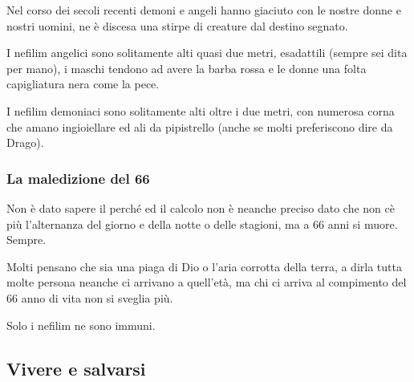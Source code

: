 \documentclass[12pt,a4paper,twoside,openany]{book}
\begin{document}
Nel corso dei secoli recenti demoni e angeli hanno giaciuto con le nostre donne e nostri uomini, ne è discesa una stirpe di creature dal destino segnato.

I nefilim angelici sono solitamente alti quasi due metri, esadattili (sempre sei dita per mano), i maschi tendono ad avere la barba rossa e le donne una folta capigliatura nera come la pece.

I nefilim demoniaci sono solitamente alti oltre i due metri, con numerosa corna che amano ingioiellare ed ali da pipistrello (anche se molti preferiscono dire da Drago).

\subsubsection{La maledizione del 66}

Non è dato sapere il perché ed il calcolo non è neanche preciso dato che non cè più l'alternanza del giorno e della notte o delle stagioni, ma a 66 anni si muore. Sempre.

Molti pensano che sia una piaga di Dio o l'aria corrotta della terra, a dirla tutta molte persona neanche ci arrivano a quell'età, ma chi ci arriva al compimento del 66 anno di vita non si sveglia più.

Solo i nefilim ne sono immuni.

\subsection{Vivere e salvarsi}
\end{document}
